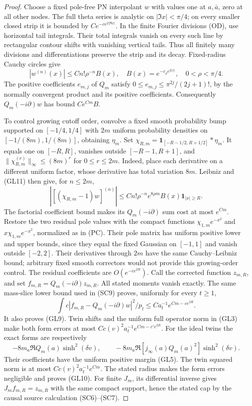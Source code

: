\documentclass[11pt]{article}
\theoremstyle{remark}\newtheorem{remark}[theorem]{Remark}
\begin{document}
\begin{proof}
Choose a fixed pole-free PN interpolant \(w\) with values one
at \(a,\bar a\), zero at all other nodes. The full theta series
is analytic on \(|\Im x|<\pi/4\); on every smaller closed
strip it is bounded by \(Ce^{-c e^{2|\Re x|}}\).
In the finite Fourier divisions (OD), use horizontal tail
integrals. Their total integrals vanish on every such line by
rectangular contour shifts with vanishing vertical tails.
Thus all finitely many divisions and differentiations preserve
the strip and its decay. Fixed-radius Cauchy circles give
\[
 |w^{(n)}(x)|\le C n!\rho^{-n}B(x),\quad
 B(x)=e^{-c_\rho e^{2|x|}},\quad 0<\rho<\pi/4.       \tag{GL11}
\]
The positive coefficients \(e_{m,j}\) of \(Q_m\) satisfy
\(0\le e_{m,j}\le\pi^{2j}/(2j+1)!\), by the normally
convergent product and its positive coefficients. Consequently
\(Q_m(-i\partial)w\) has bound \(Ce^{Cm}B\).

To control growing cutoff order, convolve a fixed smooth
probability bump supported on \([-1/4,1/4]\) with \(2m\)
uniform probability densities on \([-1/(8m),1/(8m)]\),
obtaining \(\eta_m\). Set
\(\chi_{R,m}=\mathbf1_{[-R-1/2,R+1/2]}*\eta_m\).
It equals one on \([-R,R]\), vanishes outside \([-R-1,R+1]\),
and \(\|\chi_{R,m}^{(r)}\|_\infty\le(8m)^r\) for
\(0\le r\le2m\). Indeed, place each derivative on a different
uniform factor, whose derivative has total variation \(8m\).
Leibniz and (GL11) then give, for \(n\le2m\),
\[
 |[(\chi_{R,m}-1)w]^{(n)}|
   \le C n!\rho^{-n}e^{8\rho m}B(x)\mathbf1_{|x|\ge R}.
\]
The factorial coefficient bound makes its \(Q_m(-i\partial)\)
sum cost at most \(e^{Cm}\).
Restore the two residual pole values with the compact functions
\(\chi_{1,m}e^{-x^2}\) and \(x\chi_{1,m}e^{-x^2}\), normalized
as in (PC). Their pole matrix has uniform positive lower and
upper bounds, since they equal the fixed Gaussian on \([-1,1]\)
and vanish outside \([-2,2]\). Their derivatives through \(2m\)
have the same Cauchy--Leibniz bound; arbitrary fixed smooth
correctors would not provide this growing-order control.
The residual coefficients are \(O(e^{-c e^{2R}})\).
Call the corrected function \(z_{m,R}\), and set
\(f_{m,R}=Q_m(-i\partial)z_{m,R}\).
All stated moments vanish exactly. The same mass-slice lower
bound used in (SC9) proves, uniformly for every \(t\ge1\),
\[
 \int c|f_{m,R}-Q_m(-i\partial)w|^2/p_t
       \le C a_t^{-1}e^{Cm-c e^{2R}}.                 \tag{GL12}
\]
It also proves (GL9). Twin shifts and the uniform full operator
norm in (GL3) make both form errors at most
\(C c(v)^2a_t^{-1}e^{Cm-c'e^{2R}}\).
For the ideal twins the exact forms are respectively
\[
 -8m_a\Re Q_m(a)\sinh^2(\delta v),\qquad
 -8m_a\Re[j_\infty(a)Q_m(a)^2]\sinh^2(\delta v).
\]
Their coefficients have the uniform positive margin (GL5).
The twin squared norm is at most \(C c(v)^2a_t^{-1}e^{Cm}\).
The stated radius makes the form errors negligible and proves
(GL10). For finite \(J_m\), its differential inverse gives
\(J_m f_{m,R}=z_{m,R}\) with the same compact support, hence
the stated cap by the causal source calculation (SC6)--(SC7).
\end{proof}
\end{document}
